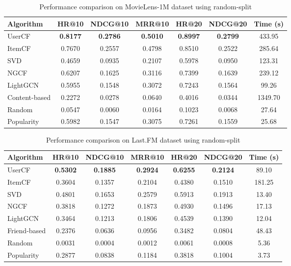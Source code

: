 \documentclass[sigconf,nonacm]{acmart} %
\begin{document}
\begin{table}[h]  
\caption{Performance comparison on MovieLens-1M dataset using random-split}  
\label{tab:ml1m_random}  
\centering  
\scriptsize  
\begin{tabular}{lcccccc}  
\hline  
\textbf{Algorithm} & \textbf{HR@10} & \textbf{NDCG@10} & \textbf{MRR@10} & \textbf{HR@20} & \textbf{NDCG@20} & \textbf{Time (s)} \\
\hline  
UserCF & \textbf{0.8177} & \textbf{0.2786} & \textbf{0.5010} & \textbf{0.8997} & \textbf{0.2799} & 433.95 \\
ItemCF & 0.7670 & 0.2557 & 0.4798 & 0.8510 & 0.2522 & 285.64 \\
SVD & 0.4659 & 0.0935 & 0.2107 & 0.5978 & 0.0950 & 123.31 \\
NGCF & 0.6207 & 0.1625 & 0.3116 & 0.7399 & 0.1639 & 239.12 \\
LightGCN & 0.5955 & 0.1548 & 0.3072 & 0.7243 & 0.1564 & 99.26 \\
Content-based & 0.2272 & 0.0278 & 0.0640 & 0.4016 & 0.0344 & 1349.70 \\
Random & 0.0547 & 0.0060 & 0.0164 & 0.1023 & 0.0068 & 27.64 \\
Popularity & 0.5982 & 0.1547 & 0.3075 & 0.7261 & 0.1559 & 25.68 \\
\hline  
\end{tabular}  
\end{table}  

\begin{table}[!t]  
\caption{Performance comparison on Last.FM dataset using random-split}  
\label{tab:lastfm_random}  
\centering  
\scriptsize  
\begin{tabular}{lcccccc}  
\hline  
\textbf{Algorithm} & \textbf{HR@10} & \textbf{NDCG@10} & \textbf{MRR@10} & \textbf{HR@20} & \textbf{NDCG@20} & \textbf{Time (s)} \\
\hline  
UserCF & \textbf{0.5302} & \textbf{0.1885} & \textbf{0.2924} & \textbf{0.6255} & \textbf{0.2124} & 89.10 \\
ItemCF & 0.3604 & 0.1357 & 0.2104 & 0.4380 & 0.1510 & 181.25 \\
SVD & 0.4801 & 0.1653 & 0.2579 & 0.5913 & 0.1913 & 13.40 \\
NGCF & 0.3818 & 0.1272 & 0.1873 & 0.4930 & 0.1496 & 17.13 \\
LightGCN & 0.3464 & 0.1213 & 0.1806 & 0.4539 & 0.1390 & 12.04 \\
Friend-based & 0.2376 & 0.0636 & 0.0956 & 0.3482 & 0.0804 & 48.43 \\
Random & 0.0031 & 0.0004 & 0.0012 & 0.0061 & 0.0008 & 5.36 \\
Popularity & 0.2877 & 0.0838 & 0.1184 & 0.3818 & 0.1004 & 3.73 \\
\hline  
\end{tabular}  
\end{table}  
\end{document}
